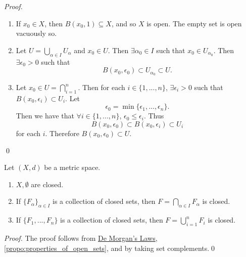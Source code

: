 \documentclass[notoc,notitlepage]{tufte-book}
\begin{document}
\begin{proof}
  \begin{enumerate}
    \item If $x_0 \in X$, then $B(x_0, 1) \subseteq X$, and so $X$ is open. The empty set is open vacuously so.
    \item Let $U = \bigcup_{\alpha \in I} U_\alpha$ and $x_0 \in U$. Then $\exists \alpha_0 \in I$ such that $x_0 \in U_{\alpha_0}$. Then $\exists \epsilon_0 > 0$ such that
      \begin{equation*}
        B(x_0, \epsilon_0) \subset U_{\alpha_0} \subset U.
      \end{equation*}
    \item Let $x_0 \in U = \bigcap_{i = 1}^{n}$. Then for each $i \in \{1, ..., n\}$, $\exists \epsilon_i > 0$ such that $B(x_0, \epsilon_i) \subset U_i$. Let
      \begin{equation*}
        \epsilon_0 = \min \{ \epsilon_1, ..., \epsilon_n \}.
      \end{equation*}
      Then we have that $\forall i \in \{1, ..., n\}$, $\epsilon_0 \leq \epsilon_i$. Thus
      \begin{equation*}
        B(x_0, \epsilon_0) \subset B(x_0, \epsilon_i) \subset U_i
      \end{equation*}
      for each $i$. Therefore $B(x_0, \epsilon_0) \subset U$.
  \end{enumerate}\qed
\end{proof}

\begin{crly}
\label{crly:properties_of_closed_sets}
  Let $(X, d)$ be a metric space.
  \begin{enumerate}
    \item $X, \emptyset$ are closed.
    \item If $\{ F_\alpha \}_{\alpha \in I}$ is a collection of closed sets, then $F = \bigcap_{\alpha \in I} F_\alpha$ is closed.
    \item If $\{ F_1, ..., F_n \}$ is a collection of closed sets, then $F = \bigcup_{i = 1}^{n} F_i$ is closed.
  \end{enumerate}
\end{crly}

\begin{proof}
  The proof follows from \hyperref[thm:de_morgan_s_laws]{De Morgan's Laws}, \cref{propo:properties_of_open_sets}, and by taking set complements.\qed
\end{proof}
\end{document}
